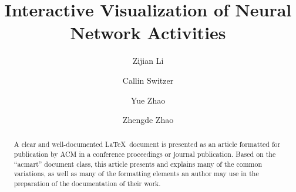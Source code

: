 \documentclass[sigchi]{acmart}
\begin{document}
\title{Interactive Visualization of Neural Network Activities}

\author{Zijian Li}

\author{Callin Switzer}

\author{Yue Zhao}

\author{Zhengde Zhao}

\begin{abstract}
  A clear and well-documented \LaTeX\ document is presented as an
  article formatted for publication by ACM in a conference proceedings
  or journal publication. Based on the ``acmart'' document class, this
  article presents and explains many of the common variations, as well
  as many of the formatting elements an author may use in the
  preparation of the documentation of their work.
\end{abstract}



\maketitle
\end{document}
